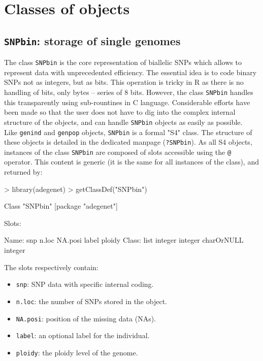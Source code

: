 \documentclass{article}
\newcommand{\code}[1]{{{\tt #1}}}
\begin{document}
\section{Classes of objects}

\subsection{\code{SNPbin}: storage of single genomes}
The class \texttt{SNPbin} is the core representation of biallelic SNPs which allows to represent
data with unprecedented efficiency.
The essential idea is to code binary SNPs not as integers, but as bits. This operation is tricky in
R as there is no handling of bits, only bytes -- series of 8 bits. However, the class
\texttt{SNPbin} handles this transparently using sub-rountines in C language.
Considerable efforts have been made so that the user does not have to dig into the complex internal
structure of the objects, and can handle \texttt{SNPbin} objects as easily as possible.
\\

Like \texttt{genind} and \texttt{genpop} objects, \texttt{SNPbin} is a formal "S4" class. The
structure of these objects is detailed in the dedicated manpage (\texttt{?SNPbin}). As all S4
objects, instances of the class \texttt{SNPbin} are composed of slots accessible using the
\texttt{@} operator. This content is generic (it is the same for all instances of the class), and returned by:
\begin{Schunk}
\begin{Sinput}
> library(adegenet)
> getClassDef("SNPbin")
\end{Sinput}
\begin{Soutput}
Class "SNPbin" [package "adegenet"]

Slots:
                                                             
Name:         snp      n.loc    NA.posi      label     ploidy
Class:       list    integer    integer charOrNULL    integer
\end{Soutput}
\end{Schunk}

The slots respectively contain:
\begin{itemize}
  \item \texttt{snp}: SNP data with specific internal coding.
  \item \texttt{n.loc}: the number of SNPs stored in the object.
  \item \texttt{NA.posi}: position of the missing data (NAs).
  \item \texttt{label}: an optional label for the individual.
  \item \texttt{ploidy}: the ploidy level of the genome.
\end{itemize}
\end{document}
